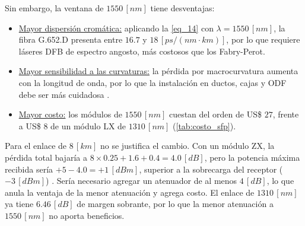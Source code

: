 Sin embargo, la ventana de $1550 \, [nm]$ tiene desventajas:
\begin{itemize}
    \item \underline{Mayor dispersión cromática:} aplicando la \autoref{eq_14} con $\lambda = 1550 \, [nm]$, la fibra G.652.D presenta entre $16.7$ y $18 \, [ps/(nm \cdot km)]$, por lo que requiere láseres DFB de espectro angosto, más costosos que los Fabry-Perot.
    \item \underline{Mayor sensibilidad a las curvaturas:} la pérdida por macrocurvatura aumenta con la longitud de onda, por lo que la instalación en ductos, cajas y ODF debe ser más cuidadosa \cite{b6}.
    \item \underline{Mayor costo:} los módulos de $1550 \, [nm]$ cuestan del orden de US\$ $27$, frente a US\$ $8$ de un módulo LX de $1310 \, [nm]$ (\autoref{tab:costo_sfp}).
\end{itemize}

Para el enlace de $8 \, [km]$ no se justifica el cambio. Con un módulo ZX, la pérdida total bajaría a $8 \times 0.25 + 1.6 + 0.4 = 4.0 \, [dB]$, pero la potencia máxima recibida sería $+5 - 4.0 = +1 \, [dBm]$, superior a la sobrecarga del receptor ($-3 \, [dBm]$) \cite{b11}. Sería necesario agregar un atenuador de al menos $4 \, [dB]$, lo que anula la ventaja de la menor atenuación y agrega costo. El enlace de $1310 \, [nm]$ ya tiene $6.46 \, [dB]$ de margen sobrante, por lo que la menor atenuación a $1550 \, [nm]$ no aporta beneficios.


